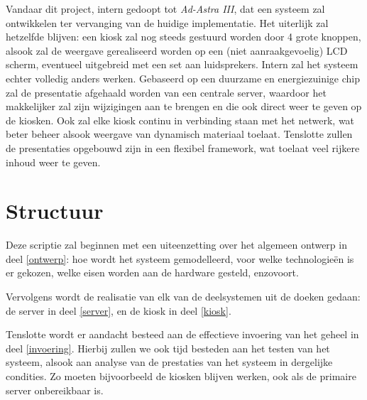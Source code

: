 Vandaar dit project, intern gedoopt tot \emph{Ad-Astra III}, dat een systeem zal ontwikkelen ter vervanging van de huidige implementatie. Het uiterlijk zal hetzelfde blijven: een kiosk zal nog steeds gestuurd worden door 4 grote knoppen, alsook zal de weergave gerealiseerd worden op een (niet aanraakgevoelig) LCD scherm, eventueel uitgebreid met een set aan luidsprekers.
Intern zal het systeem echter volledig anders werken. Gebaseerd op een duurzame en energiezuinige chip zal de presentatie afgehaald worden van een centrale server, waardoor het makkelijker zal zijn wijzigingen aan te brengen en die ook direct weer te geven op de kiosken. Ook zal elke kiosk continu in verbinding staan met het netwerk, wat beter beheer alsook weergave van dynamisch materiaal toelaat. Tenslotte zullen de presentaties opgebouwd zijn in een flexibel framework, wat toelaat veel rijkere inhoud weer te geven.


%
%

\chapter{Structuur}
\label{chat:structuur}

Deze scriptie zal beginnen met een uiteenzetting over het algemeen ontwerp in deel \ref{ontwerp}: hoe wordt het systeem gemodelleerd, voor welke technologieën is er gekozen, welke eisen worden aan de hardware gesteld, enzovoort.

Vervolgens wordt de realisatie van elk van de deelsystemen uit de doeken gedaan: de server in deel \ref{server}, en de kiosk in deel \ref{kiosk}.

Tenslotte wordt er aandacht besteed aan de effectieve invoering van het geheel in deel \ref{invoering}. Hierbij zullen we ook tijd besteden aan het testen van het systeem, alsook aan analyse van de prestaties van het systeem in dergelijke condities. Zo moeten bijvoorbeeld de kiosken blijven werken, ook als de primaire server onbereikbaar is.
